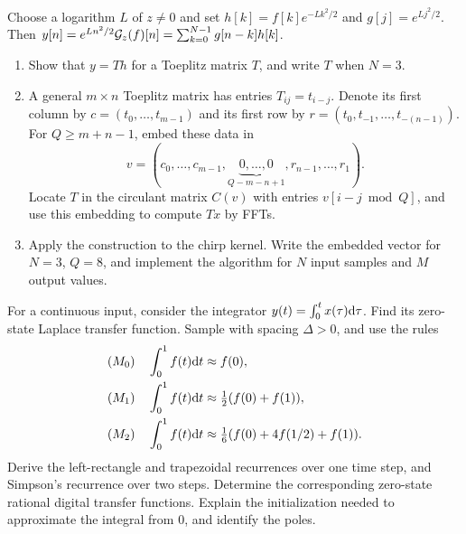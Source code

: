 \begin{exo}
\label{exo-chirp-transform-toeplitz}
Choose a logarithm $L$ of $z\ne0$ and set
$h[k]=f[k]e^{-Lk^2/2}$ and $g[j]=e^{Lj^2/2}$. Then
$y[n]=e^{Ln^2/2}\mathcal{G}_z(f)[n]=\sum_{k=0}^{N-1}g[n-k]h[k]$.
\begin{enumerate}
\item Show that $y=Th$ for a Toeplitz matrix $T$, and write $T$ when $N=3$.
\item A general $m\times n$ Toeplitz matrix has entries $T_{ij}=t_{i-j}$.
Denote its first column by $c=(t_0,\ldots,t_{m-1})$ and its first row by
$r=(t_0,t_{-1},\ldots,t_{-(n-1)})$. For $Q\geq m+n-1$, embed these data in
\[
 v=(c_0,\ldots,c_{m-1},\underbrace{0,\ldots,0}_{Q-m-n+1},r_{n-1},\ldots,r_1).
\]
Locate $T$ in the circulant matrix $C(v)$ with entries $v[i-j\bmod Q]$,
and use this embedding to compute $Tx$ by FFTs.
\item Apply the construction to the chirp kernel. Write the embedded
vector for $N=3$, $Q=8$, and implement the algorithm for $N$ input samples
and $M$ output values.
\end{enumerate}
\end{exo}


\begin{exo}
\label{exo-meth-quadratures-recursive-filter}
For a continuous input, consider the integrator
$y(t)=\int_0^t x(\tau)\mathrm{d}\tau$. Find its zero-state Laplace transfer
function. Sample with spacing $\Delta>0$, and use the rules
\begin{equation}
\label{eq-defn-meth-quadrature}
\begin{aligned}
 (M_0)\quad\int_0^1 f(t)\mathrm{d} t&\approx f(0),\\
 (M_1)\quad\int_0^1 f(t)\mathrm{d} t&\approx\tfrac12(f(0)+f(1)),\\
 (M_2)\quad\int_0^1 f(t)\mathrm{d} t&\approx\tfrac16(f(0)+4f(1/2)+f(1)).
\end{aligned}
\end{equation}
Derive the left-rectangle and trapezoidal recurrences over one time step,
and Simpson's recurrence over two steps. Determine the corresponding
zero-state rational digital transfer functions. Explain the initialization
needed to approximate the integral from $0$, and identify the poles.
\end{exo}

